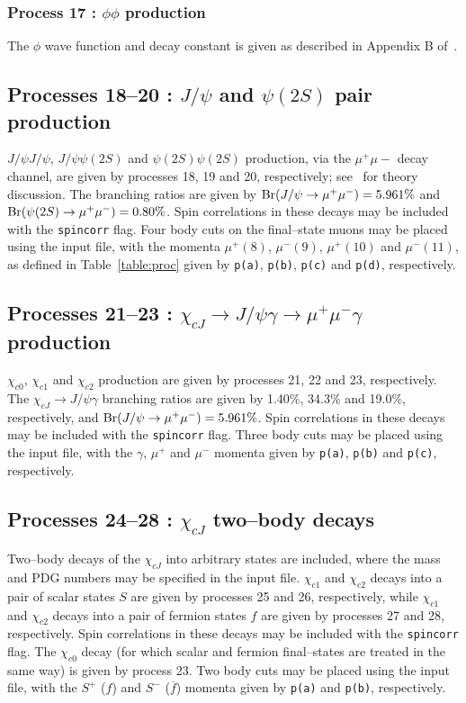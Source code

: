 \documentclass[12pt]{article}
\begin{document}
\subsubsection{Process 17 : $\phi\phi$ production}

The $\phi$ wave function and decay constant is given as described in Appendix B of~\cite{Harland-Lang:2014efa}.

\subsection{Processes 18--20 : $J/\psi$ and $\psi(2S)$ pair production}

$J/\psi J/\psi$, $J/\psi\psi(2S)$ and $\psi(2S)\psi(2S)$ production, via the $\mu^+\mu-$ decay channel, are given by processes 18, 19 and 20, 
respectively; see~\cite{Harland-Lang:2014efa} for theory discussion. The branching ratios are given by ${\rm Br}(J/\psi \to \mu^+\mu^-)=5.961\%$ 
and ${\rm Br}(\psi(2S) \to \mu^+\mu^-)=0.80\%$. Spin correlations in these decays may be included with the \texttt{spincorr} flag. Four body cuts 
on the final--state muons may be placed using the input file, with the momenta $\mu^+(8)$, $\mu^-(9)$, $\mu^+(10)$ and $\mu^-(11)$, as defined in 
Table~\ref{table:proc} given by \texttt{p(a)}, \texttt{p(b)}, \texttt{p(c)} and \texttt{p(d)}, respectively.

\subsection{Processes 21--23 : $\chi_{cJ}\to J/\psi\gamma\to \mu^+\mu^-\gamma$ production}

$\chi_{c0}$, $\chi_{c1}$ and $\chi_{c2}$ production are given by processes 21, 22 and 23, respectively. The $\chi_{cJ}\to J/\psi \gamma$ branching 
ratios are given by 1.40\%, 34.3\% and 19.0\%, respectively, and ${\rm Br}(J/\psi \to \mu^+\mu^-)=5.961\%$. Spin correlations in these decays may 
be included with the \texttt{spincorr} flag. Three body cuts may be placed using the input file, with the $\gamma$, $\mu^+$ and $\mu^-$ momenta 
given by \texttt{p(a)}, \texttt{p(b)} and \texttt{p(c)}, respectively.

\subsection{Processes 24--28 : $\chi_{cJ}$ two--body decays}

Two--body decays of the $\chi_{cJ}$ into arbitrary states are included, where the mass and PDG numbers may be specified in the input file. 
$\chi_{c1}$ and $\chi_{c2}$ decays into a pair of scalar states $S$ are given by processes 25 and 26, respectively, while $\chi_{c1}$ and 
$\chi_{c2}$ decays into a pair of fermion states $f$ are given by processes 27 and 28, respectively. Spin correlations in these decays may be 
included with the \texttt{spincorr} flag.  The $\chi_{c0}$ decay (for which scalar and fermion final--states are treated in the same way) is 
given by process 23. Two body cuts may be placed using the input file, with the $S^+$ ($f$) and $S^-$ ($\overline{f}$) momenta given by \texttt{p(a)} 
and \texttt{p(b)}, respectively.
\end{document}
